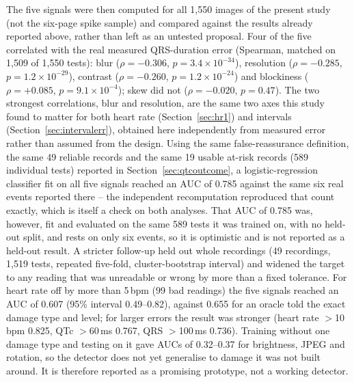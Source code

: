 The five signals were then computed for all 1{,}550 images of the present study (not the six-page spike sample) and compared against the results already reported above, rather than left as an untested proposal. Four of the five correlated with the real measured QRS-duration error (Spearman, matched on 1{,}509 of 1{,}550 tests): blur ($\rho=-0.306$, $p=3.4\times10^{-34}$), resolution ($\rho=-0.285$, $p=1.2\times10^{-29}$), contrast ($\rho=-0.260$, $p=1.2\times10^{-24}$) and blockiness ($\rho=+0.085$, $p=9.1\times10^{-4}$); skew did not ($\rho=-0.020$, $p=0.47$). The two strongest correlations, blur and resolution, are the same two axes this study found to matter for both heart rate (Section~\ref{sec:hr1}) and intervals (Section~\ref{sec:intervalerr}), obtained here independently from measured error rather than assumed from the design. Using the same false-reassurance definition, the same 49 reliable records and the same 19 usable at-risk records (589 individual tests) reported in Section~\ref{sec:qtcoutcome}, a logistic-regression classifier fit on all five signals reached an AUC of 0.785 against the same six real events reported there -- the independent recomputation reproduced that count exactly, which is itself a check on both analyses. That AUC of 0.785 was, however, fit and evaluated on the same 589 tests it was trained on, with no held-out split, and rests on only six events, so it is optimistic and is not reported as a held-out result. A stricter follow-up held out whole recordings (49 recordings, 1{,}519 tests, repeated five-fold, cluster-bootstrap interval) and widened the target to any reading that was unreadable or wrong by more than a fixed tolerance. For heart rate off by more than 5\,bpm (99 bad readings) the five signals reached an AUC of 0.607 (95\% interval 0.49--0.82), against 0.655 for an oracle told the exact damage type and level; for larger errors the result was stronger (heart rate $>$10\,bpm 0.825, QTc $>$60\,ms 0.767, QRS $>$100\,ms 0.736). Training without one damage type and testing on it gave AUCs of 0.32--0.37 for brightness, JPEG and rotation, so the detector does not yet generalise to damage it was not built around. It is therefore reported as a promising prototype, not a working detector.
